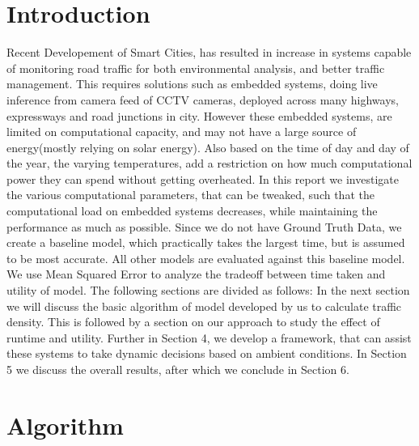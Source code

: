 \documentclass[conference]{IEEEtran}
\begin{document}
\section{Introduction}
Recent Developement of Smart Cities, has resulted in increase in systems capable of monitoring
road traffic for both environmental analysis, and better traffic management. This requires solutions such as embedded systems,
doing live inference from camera feed of CCTV cameras, deployed across many highways, expressways and road junctions in city.
However these embedded systems, are limited on computational capacity, and may not have a large source of energy(mostly relying on solar energy).
Also based on the time of day and day of the year, the varying temperatures, add a restriction on how much computational power they can spend without getting overheated.
In this report we investigate the various computational parameters, that can be tweaked, such that the computational load on embedded systems decreases, while maintaining
the performance as much as possible. Since we do not have Ground Truth Data,  we create a baseline model, which practically takes the largest time, but is assumed to be most accurate.
All other models are evaluated against this baseline model. We use Mean Squared Error to analyze the tradeoff between time taken and utility of model.
The following sections are divided as follows:
In the next section we will discuss the basic algorithm of model developed by us to calculate traffic density. This is followed by a section on our
approach to study the effect of runtime and utility. Further in Section 4, we develop a framework, that can assist these systems to take dynamic decisions based on ambient conditions.
In Section 5 we discuss the overall results, after which we conclude in Section 6.




\section{Algorithm}
    
\end{document}
